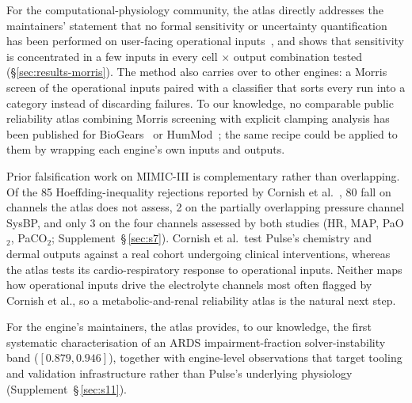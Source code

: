 \documentclass[pdflatex,sn-nature]{sn-jnl}%
\begin{document}
For the computational-physiology community, the atlas directly addresses the maintainers' statement that no formal sensitivity or uncertainty quantification has been performed on user-facing operational inputs~\cite{pulsefaq}, and shows that sensitivity is concentrated in a few inputs in every cell $\times$ output combination tested (\S\ref{sec:results-morris}). The method also carries over to other engines: a Morris screen of the operational inputs paired with a classifier that sorts every run into a category instead of discarding failures. To our knowledge, no comparable public reliability atlas combining Morris screening with explicit clamping analysis has been published for BioGears~\cite{baird2020biogears} or HumMod~\cite{hester2011hummod}; the same recipe could be applied to them by wrapping each engine's own inputs and outputs.

Prior falsification work on MIMIC-III is complementary rather than overlapping. Of the 85 Hoeffding-inequality rejections reported by Cornish et al.~\cite{cornish2023}, 80 fall on channels the atlas does not assess, 2 on the partially overlapping pressure channel SysBP, and only 3 on the four channels assessed by both studies (HR, MAP, PaO$_2$, PaCO$_2$; Supplement~\S\,\ref{sec:s7}). Cornish et al.\ test Pulse's chemistry and dermal outputs against a real cohort undergoing clinical interventions, whereas the atlas tests its cardio-respiratory response to operational inputs. Neither maps how operational inputs drive the electrolyte channels most often flagged by Cornish et al., so a metabolic-and-renal reliability atlas is the natural next step.

For the engine's maintainers, the atlas provides, to our knowledge, the first systematic characterisation of an ARDS impairment-fraction solver-instability band ($[0.879, 0.946]$), together with engine-level observations that target tooling and validation infrastructure rather than Pulse's underlying physiology (Supplement~\S\,\ref{sec:s11}).
\end{document}
